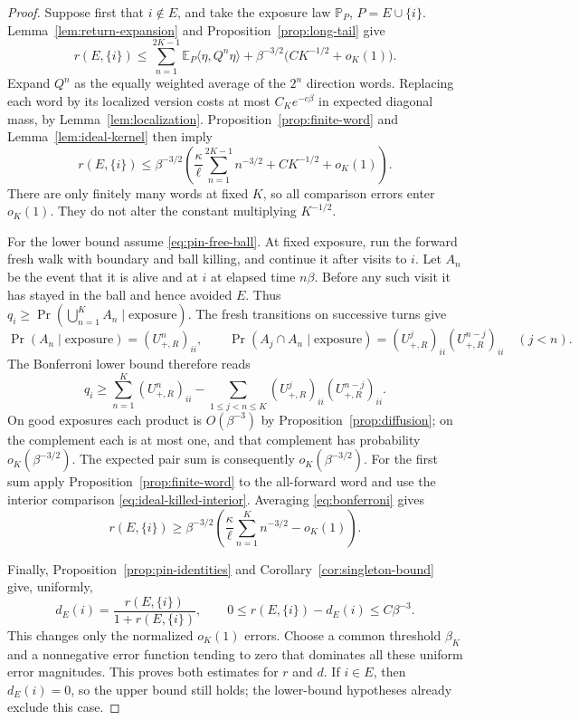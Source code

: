 \begin{proof}
Suppose first that \(i\notin E\), and take the exposure law
\(\mathbb P_P\), \(P=E\cup\{i\}\). Lemma~\ref{lem:return-expansion}
and Proposition~\ref{prop:long-tail} give
\[
 r(E,\{i\})\le
 \sum_{n=1}^{2K-1}\mathbb E_P\langle\eta,Q^n\eta\rangle
 +\beta^{-3/2}\bigl(CK^{-1/2}+o_K(1)\bigr).
\]
Expand \(Q^n\) as the equally weighted average of the \(2^n\)
direction words. Replacing each word by its localized version costs
at most \(C_Ke^{-c\beta}\) in expected diagonal mass, by
Lemma~\ref{lem:localization}. Proposition~\ref{prop:finite-word} and
Lemma~\ref{lem:ideal-kernel} then imply
\[
 r(E,\{i\})\le\beta^{-3/2}
 \left(\frac\kappa\ell\sum_{n=1}^{2K-1}n^{-3/2}
                   +CK^{-1/2}+o_K(1)\right).
\]
There are only finitely many words at fixed \(K\), so all comparison
errors enter \(o_K(1)\). They do not alter the constant multiplying
\(K^{-1/2}\).

For the lower bound assume \eqref{eq:pin-free-ball}. At fixed exposure,
run the forward fresh walk with boundary and ball killing, and continue
it after visits to \(i\). Let \(A_n\) be the event that it is alive
and at \(i\) at elapsed time \(n\beta\). Before any such visit it
has stayed in the ball and hence avoided \(E\). Thus
\(q_i\ge\Pr(\bigcup_{n=1}^K A_n\mid\text{exposure})\).
The fresh transitions on successive turns give
\[
 \Pr(A_n\mid\text{exposure})=(U_{+,R}^n)_{ii},\qquad
 \Pr(A_j\cap A_n\mid\text{exposure})
     =(U_{+,R}^j)_{ii}(U_{+,R}^{n-j})_{ii}\quad(j<n).
\]
The Bonferroni lower bound therefore reads
\begin{equation}\label{eq:bonferroni}
 q_i\ge\sum_{n=1}^K(U_{+,R}^n)_{ii}
 -\sum_{1\le j<n\le K}
       (U_{+,R}^j)_{ii}(U_{+,R}^{n-j})_{ii}.
\end{equation}
On good exposures each product is \(O(\beta^{-3})\) by
Proposition~\ref{prop:diffusion}; on the complement each is at most
one, and that complement has probability \(o_K(\beta^{-3/2})\).
The expected pair sum is consequently \(o_K(\beta^{-3/2})\).
For the first sum apply Proposition~\ref{prop:finite-word} to the
all-forward word and use the interior comparison
\eqref{eq:ideal-killed-interior}. Averaging \eqref{eq:bonferroni}
gives
\[
 r(E,\{i\})\ge\beta^{-3/2}
 \left(\frac\kappa\ell\sum_{n=1}^{K}n^{-3/2}-o_K(1)\right).
\]

Finally, Proposition~\ref{prop:pin-identities} and
Corollary~\ref{cor:singleton-bound} give, uniformly,
\[
 d_E(i)=\frac{r(E,\{i\})}{1+r(E,\{i\})},\qquad
 0\le r(E,\{i\})-d_E(i)\le C\beta^{-3}.
\]
This changes only the normalized \(o_K(1)\) errors. Choose a common
threshold \(\beta_K\) and a nonnegative error function tending to
zero that dominates all these uniform error magnitudes. This proves
both estimates for \(r\) and \(d\). If \(i\in E\), then
\(d_E(i)=0\), so the upper bound still holds; the lower-bound
hypotheses already exclude this case.
\end{proof}
